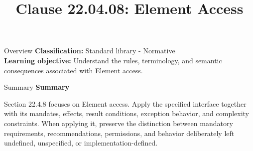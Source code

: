 \documentclass[10pt,letterpaper]{article}
\title{Clause 22.04.08: Element Access}
\author{}
\date{}
\begin{document}
\maketitle
\begin{CornellOverviewBox}{Overview}
\textbf{Classification:} Standard library - Normative\\[2pt]
\textbf{Learning objective:} Understand the rules, terminology, and semantic consequences associated with Element access.
\end{CornellOverviewBox}\begin{CornellSummaryBox}{Summary}
{\sffamily\bfseries\color{Accent} Summary}\par\vspace{3pt}Section 22.4.8 focuses on Element access. Apply the specified interface together with its mandates, effects, result conditions, exception behavior, and complexity constraints. When applying it, preserve the distinction between mandatory requirements, recommendations, permissions, and behavior deliberately left undefined, unspecified, or implementation-defined.
\end{CornellSummaryBox}
\end{document}
